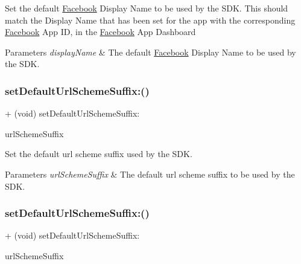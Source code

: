 Set the default \hyperlink{interfaceFacebook}{Facebook} Display Name to be used by the S\+DK. This should match the Display Name that has been set for the app with the corresponding \hyperlink{interfaceFacebook}{Facebook} App ID, in the \hyperlink{interfaceFacebook}{Facebook} App Dashboard


\begin{DoxyParams}{Parameters}
{\em display\+Name} & The default \hyperlink{interfaceFacebook}{Facebook} Display Name to be used by the S\+DK. \\
\hline
\end{DoxyParams}
\mbox{\label{interfaceFBSettings_a08a9504a71c1c9ec329e97da7c636337}} 
\subsubsection{\texorpdfstring{set\+Default\+Url\+Scheme\+Suffix\+:()}{setDefaultUrlSchemeSuffix:()}\hspace{0.1cm}{\footnotesize\ttfamily [1/5]}}
{\footnotesize\ttfamily + (void) set\+Default\+Url\+Scheme\+Suffix\+: \begin{DoxyParamCaption}\item[{(N\+S\+String $\ast$)}]{url\+Scheme\+Suffix }\end{DoxyParamCaption}}

Set the default url scheme suffix used by the S\+DK.


\begin{DoxyParams}{Parameters}
{\em url\+Scheme\+Suffix} & The default url scheme suffix to be used by the S\+DK. \\
\hline
\end{DoxyParams}
\mbox{\label{interfaceFBSettings_a08a9504a71c1c9ec329e97da7c636337}} 
\subsubsection{\texorpdfstring{set\+Default\+Url\+Scheme\+Suffix\+:()}{setDefaultUrlSchemeSuffix:()}\hspace{0.1cm}{\footnotesize\ttfamily [2/5]}}
{\footnotesize\ttfamily + (void) set\+Default\+Url\+Scheme\+Suffix\+: \begin{DoxyParamCaption}\item[{(N\+S\+String $\ast$)}]{url\+Scheme\+Suffix }\end{DoxyParamCaption}}

